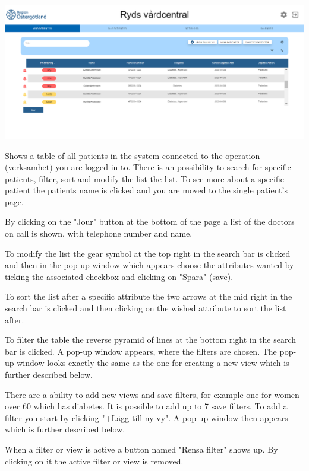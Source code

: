 \begin{center}
    \includegraphics[width=\linewidth]{images/My_patiens_image.png}
    \label{fig:figures}
\end{center}
Shows a table of all patients in the system connected to the operation (verksamhet) you are logged in to. There is an possibility to search for specific patients, filter, sort and modify the list the list. To see more about a specific patient the patients name is clicked and you are moved to the single patient's page.

By clicking on the "Jour" button at the bottom of the page a list of the doctors on call is shown, with telephone number and name.

To modify the list the gear symbol at the top right in the search bar is clicked and then in the pop-up window which appears choose the attributes wanted by ticking the associated checkbox and clicking on "Spara" (save).

To sort the list after a specific attribute the two arrows at the mid right in the search bar is clicked and then clicking on the wished attribute to sort the list after. 

To filter the table the reverse pyramid of lines at the bottom right in the search bar is clicked. A pop-up window appears, where the filters are chosen. The pop-up window looks exactly the same as the one for creating a new view which is further described below. 

There are a ability to add new views and save filters, for example one for women over 60 which has diabetes. It is possible to add up to 7 save filters. To add a filter you start by clicking "+Lägg till ny vy". A pop-up window then appears which is further described below. 

When a filter or view is active a button named "Rensa filter" shows up. By clicking on it the active filter or view is removed. 
\\


